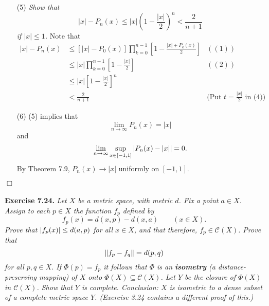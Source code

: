 \documentclass{article}
\begin{document}
\begin{enumerate}
\item[(5)]
\emph{Show that
\[
  |x| - P_n(x) \leq |x| \left(1-\frac{|x|}{2}\right)^n < \frac{2}{n+1}
\]
if $|x| \leq 1$.}
Note that
\begin{align*}
  |x| - P_n(x)
  &\leq [ |x| - P_0(x) ] \prod_{k=0}^{n-1}\left[1-\frac{|x|+P_k(x)}{2}\right]
    & ((1)) \\
  &\leq |x| \prod_{k=0}^{n-1}\left[1-\frac{|x|}{2}\right]
    & ((2)) \\
  &\leq |x| \left[1-\frac{|x|}{2}\right]^n \\
  & < \frac{2}{n+1}
    & \text{(Put $t=\frac{|x|}{2}$ in (4))}.
\end{align*}

\item[(6)]
(5) implies that
\[
  \lim_{n \to \infty} P_n(x) = |x|
\]
and
\[
  \lim_{n \to \infty} \sup_{x \in [-1,1]}\abs{ P_n(x) - |x| } = 0.
\]
By Theorem 7.9, $P_n(x) \to |x|$ uniformly on $[-1,1]$.
\end{enumerate}
$\Box$ \\\\






\textbf{Exercise 7.24.}
\emph{Let $X$ be a metric space, with metric $d$.
Fix a point $a \in X$.
Assign to each $p \in X$ the function $f_p$ defined by
\[
  f_p(x) = d(x,p) - d(x,a)
  \qquad
  (x \in X).
\]
Prove that $\abs{ f_p(x) } \leq d(a,p)$ for all $x \in X$,
and that therefore, $f_p \in \mathscr{C}(X)$.
Prove that
\[
  \norm{ f_p - f_q } = d(p,q)
\]
for all $p,q \in X$.
If $\Phi(p) = f_p$ it follows that $\Phi$ is an \textbf{isometry}
(a distance-preserving mapping)
of $X$ onto $\Phi(X) \subseteq \mathscr{C}(X)$.
Let $Y$ be the closure of $\Phi(X)$ in $\mathscr{C}(X)$.
Show that $Y$ is complete.
Conclusion: $X$ is isometric to a dense subset of a complete metric space $Y$.
(Exercise 3.24 contains a different proof of this.)} \\
\end{document}
